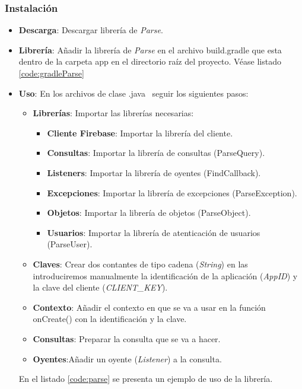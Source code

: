 	\subsubsection{Instalación}
	\begin{itemize}
		\item {\bf Descarga}: Descargar librería de {\it Parse}.
		\item {\bf Librería}: Añadir la librería de {\it Parse} en el archivo {\ttfamily build.gradle} que esta dentro de la carpeta {\ttfamily app} en el directorio raíz del proyecto. Véase listado \ref{code:gradleParse}

		
		\newpage
		
		\item {\bf Uso}: En los archivos de clase {\ttfamily  .java}\ \cite{19:java:online} seguir los siguientes pasos:
		\begin{itemize}
			\item {\bf Librerías}: Importar las librerías necesarias:
			\begin{itemize}
				\item {\bf Cliente Firebase}: Importar la librería del cliente.
				\item {\bf Consultas}: Importar la librería de consultas ({\ttfamily ParseQuery}).
				\item {\bf Listeners}: Importar la librería de oyentes ({\ttfamily FindCallback}).
				\item {\bf Excepciones}: Importar la librería de excepciones ({\ttfamily ParseException}).
				\item {\bf Objetos}: Importar la librería de objetos ({\ttfamily ParseObject}).
				\item {\bf Usuarios}: Importar la librería de atenticación de usuarios ({\ttfamily ParseUser}).
			\end{itemize}
			\item {\bf Claves}: Crear dos contantes de tipo cadena ({\it String}) en las introduciremos manualmente la identificación de la aplicación ({\it AppID}) y la clave del cliente ({\it CLIENT\_KEY}).
			\item {\bf Contexto}: Añadir el contexto en que se va a usar en la función {\ttfamily onCreate()} con la identificación y la clave.
			\item {\bf Consultas}: Preparar la consulta que se va a hacer.
			\item {\bf Oyentes}:Añadir un oyente ({\it Listener}) a la consulta.
		\end{itemize}
		
		En el listado \ref{code:parse} se presenta un ejemplo de uso de la librería.
		
		\newpage
		\noindent
		
	\end{itemize}
		
